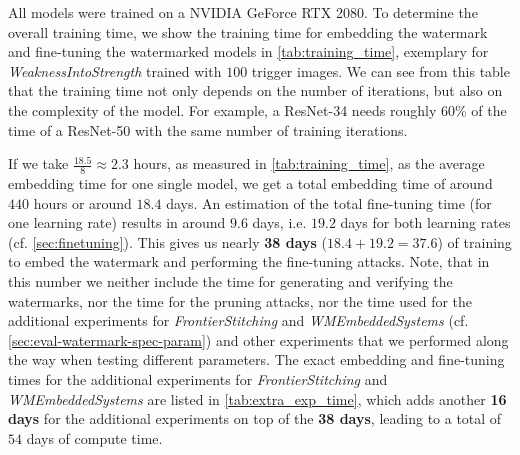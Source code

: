 All models were trained on a NVIDIA GeForce RTX 2080. To determine the overall training time, we show the training time for embedding the watermark and fine-tuning the watermarked models in \cref{tab:training_time}, exemplary for \textit{WeaknessIntoStrength} trained with $100$ trigger images. We can see from this table that the training time not only depends on the number of iterations, but also on the complexity of the model. For example, a ResNet-34 needs roughly 60\% of the time of a ResNet-50 with the same number of training iterations.


If we take $\frac{18.5}{8} \approx 2.3$ hours, as measured in \cref{tab:training_time}, as the average embedding time for one single model, we get a total embedding time of around $440$ hours or around $18.4$ days. An estimation of the total fine-tuning time (for one learning rate) results in around $9.6$ days, i.e. $19.2$ days for both learning rates (cf. \cref{sec:finetuning}). This gives us nearly \textbf{38 days} ($18.4+19.2=37.6$) of training to embed the watermark and performing the fine-tuning attacks. Note, that in this number we neither include the time for generating and verifying the watermarks, nor the time for the pruning attacks, nor the time used for the additional experiments for \textit{FrontierStitching} and \textit{WMEmbeddedSystems} (cf. \cref{sec:eval-watermark-spec-param}) and other experiments that we performed along the way when testing different parameters. The exact embedding and fine-tuning times for the additional experiments for \textit{FrontierStitching} and \textit{WMEmbeddedSystems} are listed in \cref{tab:extra_exp_time}, which adds another \textbf{16 days} for the additional experiments on top of the \textbf{38 days}, leading to a total of $54$ days of compute time.




